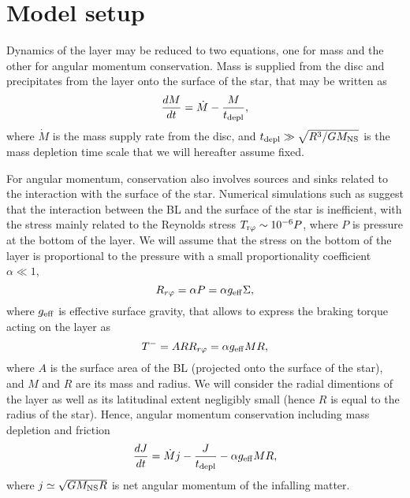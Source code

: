 \documentclass[useAMS,usenatbib,onecolumn,12pt]{mnras}
\title[]{}
\begin{document}
\date{Accepted ---. Received ---; in
  original form --- }

\pagerange{\pageref{firstpage}--\pageref{lastpage}} 

\maketitle

\label{firstpage}

\begin{abstract}
\end{abstract}

\begin{keywords}
\end{keywords}

\section{Model setup}

Dynamics of the layer may be reduced to two equations, one for mass and the other for angular momentum conservation. Mass is supplied from the disc and precipitates from the layer onto the surface of the star, that may be written as
\begin{equation}\label{E:dM}
  \frac{dM}{dt} = \dot{M} - \frac{M}{t_{\rm depl}},
\end{equation}
where $\dot{M}$ is the mass supply rate from the disc, and $t_{\rm depl} \gg \sqrt{R^3/GM_{\rm NS}}$ is the mass depletion time scale that we will hereafter assume fixed.

For angular momentum, conservation also involves sources and sinks related to the interaction with the surface of the star.
Numerical simulations such as \citet{belyaev13} suggest that the interaction between the BL and the surface of the star is inefficient, with the stress mainly related to the Reynolds stress $T_{\rm r\varphi} \sim 10^{-6}P$, where $P$ is pressure at the bottom of the layer.
We will assume that the stress on the bottom of the layer is proportional to the pressure with a small proportionality coefficient $\alpha \ll 1$,
\begin{equation}
  R_{r\varphi} = \alpha P = \alpha g_{\rm eff} \Sigma,
\end{equation}
where $g_{\rm eff}$ is effective surface gravity,
that allows to express the braking torque acting on the layer as
\begin{equation}
T^- = A R R_{r\varphi} =  \alpha g_{\rm eff} M R,
\end{equation}
where $A$ is the surface area of the BL (projected onto the surface of the star), and $M$ and $R$ are its mass and radius. We will consider the radial dimentions of the layer as well as its latitudinal extent negligibly small (hence $R$ is equal to the radius of the star).
Hence, angular momentum conservation including mass depletion and friction
\begin{equation}\label{E:dJ}
  \frac{dJ}{dt} = \dot{M}j - \frac{J}{t_{\rm depl}} - \alpha g_{\rm eff} M R,
\end{equation}
where $j \simeq \sqrt{GM_{\rm NS}R}$ is net angular momentum of the infalling matter. 
\end{document}
